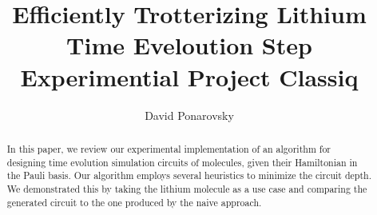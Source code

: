 \documentclass{article}
\begin{document}
    
\title{ Efficiently Trotterizing Lithium Time Eveloution Step  \\  Experimential Project  Classiq}
\author{David Ponarovsky}
\maketitle

\begin{abstract} 
In this paper, we review our experimental implementation of an algorithm for designing time evolution simulation circuits of molecules, given their Hamiltonian in the Pauli basis. Our algorithm employs several heuristics to minimize the circuit depth. We demonstrated this by taking the lithium molecule as a use case and comparing the generated circuit to the one produced by the naive approach.
\end{abstract}
\end{document}
